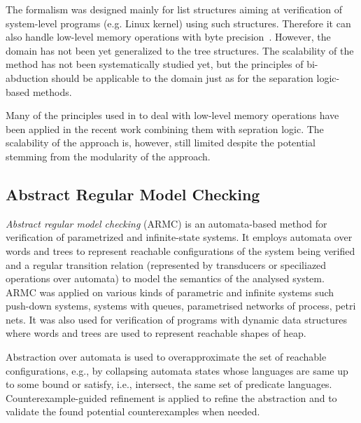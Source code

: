 	  The formalism was designed mainly for list structures aiming at verification
	  of system-level programs (e.g. Linux kernel) using such structures.
	  Therefore it can also handle low-level memory operations with byte precision~\cite{dudka13sas}.
	  However, the domain has not been yet generalized to the tree structures.
	  The scalability of the method has not been systematically studied yet, but the principles of bi-abduction
	  should be applicable to the domain just as for the separation logic-based methods.

          Many of the principles used in \cite{dudka13sas} to deal with low-level memory operations have been applied
          in the recent work \cite{soa-biabduction} combining them with sepration logic. The scalability of the approach is, however,
          still limited despite the potential stemming from the modularity of the approach.

	  \subsection{Abstract Regular Model Checking}
	  \label{subsection:armc}
	  \emph{Abstract regular model checking} (ARMC) \cite{artmc} is an automata-based method for verification of parametrized and infinite-state systems.
	  It employs automata over words and trees to represent reachable configurations of the system being verified
	  and a regular transition relation (represented by transducers or speciliazed operations over automata) to model the semantics of the analysed system.
          ARMC was applied on various kinds of parametric and infinite systems such push-down systems, systems with queues, parametrised networks of process,
          petri nets.
          It was also used for verification of programs with dynamic data structures where words and trees are used
          to represent reachable shapes of heap\cite{bhrv06a}.

	  Abstraction over automata is used to overapproximate the set of reachable configurations,
          e.g., by collapsing automata states whose languages are same up to some bound or satisfy, i.e., intersect,
          the same set of predicate languages. 
	  Counterexample-guided refinement is applied to
	  refine the abstraction and to validate the found potential counterexamples when needed.

